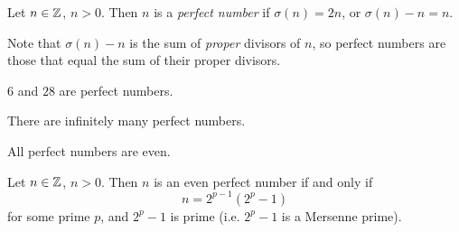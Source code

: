 \begin{definition}
  Let $n \in \mathbb{Z}$, $n > 0$. Then
  $n$ is a \emph{perfect number} if
  $\sigma(n) = 2n$, or
  $\sigma(n) - n = n$.
\end{definition}

\begin{remark}
  Note that $\sigma(n) - n$ is the
  sum of \emph{proper} divisors of $n$, so
  perfect numbers are those that
  equal the sum of their proper
  divisors.
\end{remark}

\begin{example}
  $6$ and $28$ are perfect numbers.
\end{example}

\begin{conjecture}
  There are infinitely many perfect
  numbers.
\end{conjecture}

\begin{conjecture}
  All perfect numbers are even.
\end{conjecture}

\begin{theorem}\label{thm:even-perfect}
  Let $n \in \mathbb{Z}$, $n > 0$.
  Then $n$ is an even perfect number
  if and only if
  \[
    n = 2^{p - 1}(2^p - 1)
  \]
  for some prime $p$, and $2^p - 1$
  is prime (i.e. $2^p - 1$ is
  a Mersenne prime).
\end{theorem}


